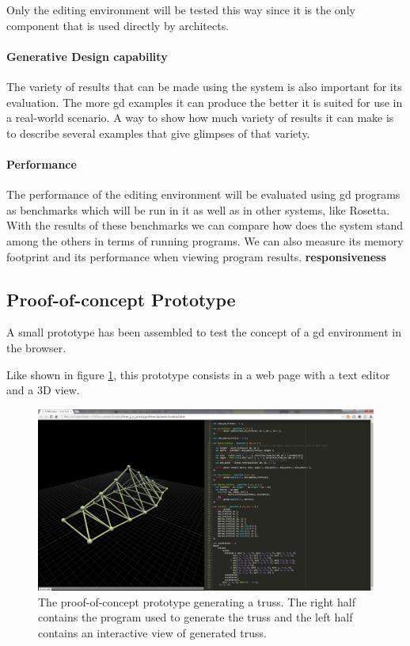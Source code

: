 \documentclass{./llncs2e/llncs}
\begin{document}
	Only the editing environment will be tested this way since it is the only component that is used directly by architects.
	
	\paragraph{Generative Design capability}
	The variety of results that can be made using the system is also important for its evaluation.
	The more \ac{gd} examples it can produce the better it is suited for use in a real-world scenario.
	A way to show how much variety of results it can make is to describe several examples that give glimpses of that variety.
	
	\paragraph{Performance}
	The performance of the editing environment will be evaluated using \ac{gd} programs as benchmarks which will be run in it as well as in other systems, like Rosetta.
	With the results of these benchmarks we can compare how does the system stand among the others in terms of running programs.
	We can also measure its memory footprint and its performance when viewing program results.
	\textbf{responsiveness}

\subsection{Proof-of-concept Prototype}
	A small prototype has been assembled to test the concept of a \ac{gd} environment in the browser.

	Like shown in figure \ref{fig:proto:3d:p:editor}, this prototype consists in a web page with a text editor and a 3D view.

	\begin{figure}
	  \centering
	  \includegraphics[width=1.0\textwidth]{img/proto_3d_p_editor}
	    \caption{The proof-of-concept prototype generating a truss. The right half contains the program used to generate the truss and the left half contains an interactive view of generated truss.}
	  \label{fig:proto:3d:p:editor}
	\end{figure} 
\end{document}
